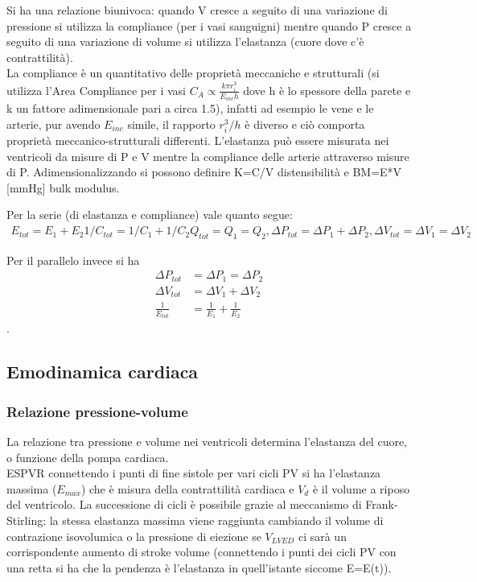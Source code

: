 \documentclass[10pt]{article}
\begin{document}
Si ha una relazione biunivoca: quando V cresce a seguito di una variazione di pressione si utilizza la compliance (per i vasi sanguigni) mentre quando P cresce a seguito di una variazione di volume si utilizza l'elastanza (cuore dove c'è contrattilità).\\
La compliance è un quantitativo delle proprietà meccaniche e strutturali (si utilizza l'Area Compliance per i vasi $C_A \propto \frac{k \pi r_i^3}{E_{inc}h}$ dove h è lo spessore della parete e k un fattore adimensionale pari a circa 1.5), infatti ad esempio le vene e le arterie, pur avendo $E_{inc}$ simile, il rapporto $r_i^3/h$ è diverso e ciò comporta proprietà meccanico-strutturali differenti.
L'elastanza può essere misurata nei ventricoli da misure di P e V mentre la compliance delle arterie attraverso misure di P.
Adimensionalizzando si possono definire K=C/V \textrightarrow distensibilità e BM=E*V [mmHg] \textrightarrow bulk modulus.


Per la serie (di elastanza e compliance) vale quanto segue:
\begin{equation}
    \begin{split}
        E_{tot}=E_1+E_2 
        1/C_{tot}=1/C_1+1/C_2
        Q_{tot}=Q_1=Q_2, \Delta P_{tot}=\Delta P_1 +\Delta P_2, \Delta V_{tot}=\Delta V_1=\Delta V_2
    \end{split}
\end{equation}

Per il parallelo invece si ha
\begin{align*}
    \Delta P_{tot} &=\Delta P_1=\Delta P_2\\
    \Delta V_{tot} &=\Delta V_1+ \Delta V_2 \\
    \frac{1}{E_{tot}} &=\frac{1}{E_1}+\frac{1}{E_2}
\end{align*}.

\subsection{Emodinamica cardiaca}

\subsubsection{Relazione pressione-volume}

La relazione tra pressione e volume nei ventricoli determina l'elastanza del cuore, o funzione della pompa cardiaca. \\
ESPVR   \textrightarrow connettendo i punti di fine sistole per vari cicli PV si ha l'elastanza massima ($E_{max}$) che è misura della contrattilità cardiaca e $V_d$ è il volume a riposo del ventricolo. La successione di cicli è possibile grazie al meccanismo di Frank-Stirling: la stessa elastanza massima viene raggiunta cambiando il volume di contrazione isovolumica o la pressione di eiezione \textrightarrow se $V_{LVED}$ ci sarà un corrispondente aumento di stroke volume (connettendo i punti dei cicli PV con una retta si ha che la pendenza è l'elastanza in quell'istante siccome E=E(t)).
\end{document}
